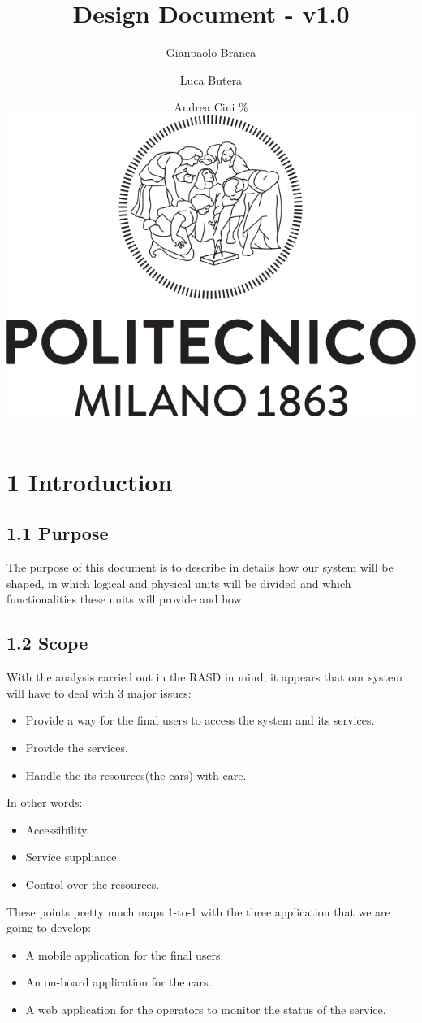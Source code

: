 \documentclass[]{article}
\title{\textbf{Design Document - v1.0}}
\author{Gianpaolo Branca \and Luca Butera \and Andrea Cini \newline
\%\includegraphics{polimi.png}\newpage}
\date{}
\providecommand{\tightlist}{%
  \setlength{\itemsep}{0pt}\setlength{\parskip}{0pt}}
\begin{document}
\maketitle

{
\setcounter{tocdepth}{6}
\tableofcontents
}
\newpage

\section{1 Introduction}\label{introduction}

\subsection{1.1 Purpose}\label{purpose}

The purpose of this document is to describe in details how our system
will be shaped, in which logical and physical units will be divided and
which functionalities these units will provide and how.

\subsection{1.2 Scope}\label{scope}

With the analysis carried out in the RASD in mind, it appears that our
system will have to deal with 3 major issues:

\begin{itemize}
\tightlist
\item
  Provide a way for the final users to access the system and its
  services.
\item
  Provide the services.
\item
  Handle the its resources(the cars) with care.
\end{itemize}

In other words:

\begin{itemize}
\tightlist
\item
  Accessibility.
\item
  Service suppliance.
\item
  Control over the resources.
\end{itemize}

These points pretty much maps 1-to-1 with the three application that we
are going to develop:

\begin{itemize}
\tightlist
\item
  A mobile application for the final users.
\item
  An on-board application for the cars.
\item
  A web application for the operators to monitor the status of the
  service.
\end{itemize}
\end{document}
